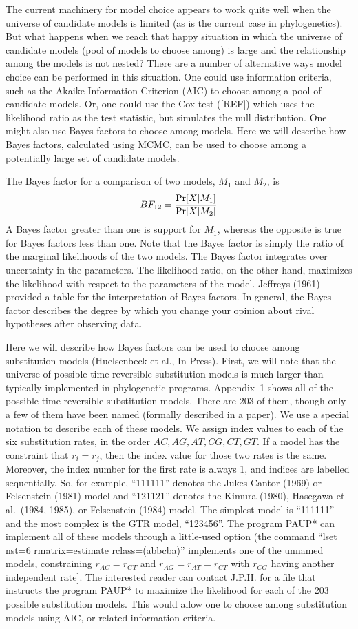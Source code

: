 \documentclass{svmult}
\begin{document}
The current machinery for model choice appears to work quite well when the universe of candidate
models is limited (as is the current case in phylogenetics). But what happens when we reach that
happy situation in which the universe of candidate models (pool of models to choose among) is large
and the relationship among the models is not nested? There are a number of alternative ways model
choice can be performed in this situation. One could use information criteria, such as the Akaike
Information Criterion (AIC) to choose among a pool of candidate models. Or, one could use the Cox
test ([REF]) which uses the likelihood ratio as the test statistic, but simulates the null
distribution. One might also use Bayes factors to choose among models. Here we will describe how
Bayes factors, calculated using MCMC, can be used to choose among a potentially large set of
candidate models. 

The Bayes factor for a comparison of two models, $M_1$ and $M_2$, is
$$
BF_{12} = {\Pr[X | M_1] \over \Pr[X | M_2]}
$$
A Bayes factor greater than one is support for $M_1$, whereas the opposite is true for Bayes
factors less than one.  Note that the Bayes factor is simply the ratio of the marginal likelihoods
of the two models. The Bayes factor integrates over uncertainty in the parameters. The likelihood
ratio, on the other hand, maximizes the likelihood with respect to the parameters of the model.
Jeffreys (1961) provided a table for the interpretation of Bayes factors. In general, the Bayes
factor describes the degree by which you change your opinion about rival hypotheses after observing
data.

Here we will describe how Bayes factors can be used to choose among substitution models
(Huelsenbeck et al., In Press). First, we will note that the universe of possible time-reversible
substitution models is much larger than typically implemented in phylogenetic programs. Appendix~1
shows all of the possible time-reversible substitution models. There are 203 of them, though only a
few of them have been named (formally described in a paper). We use a special notation to describe
each of these models. We assign index values to each of the six substitution rates, in the order
$AC, AG, AT, CG, CT, GT$.  If a model has the constraint that $r_i = r_j$, then the index value for
those two rates is the same. Moreover, the index number for the first rate is always 1, and indices
are labelled sequentially. So, for example, ``111111'' denotes the Jukes-Cantor (1969) or
Felsenstein (1981) model and ``121121'' denotes the Kimura (1980), Hasegawa et al.\ (1984, 1985),
or Felsenstein (1984) model. The simplest model is ``111111'' and the most complex is the GTR
model, ``123456''. The program PAUP* can implement all of these models through a little-used
option (the command ``lset nst=6 rmatrix=estimate rclass=(abbcba)''  implements one of the unnamed
models, constraining $r_{AC} = r_{GT}$ and $r_{AG} = r_{AT} = r_{CT}$ with $r_{CG}$ having another
independent rate]. The interested reader can contact J.P.H. for a file that instructs the program
PAUP* to maximize the likelihood for each of the 203 possible substitution models. This would allow
one to choose among substitution models using AIC, or related information criteria.
\end{document}

